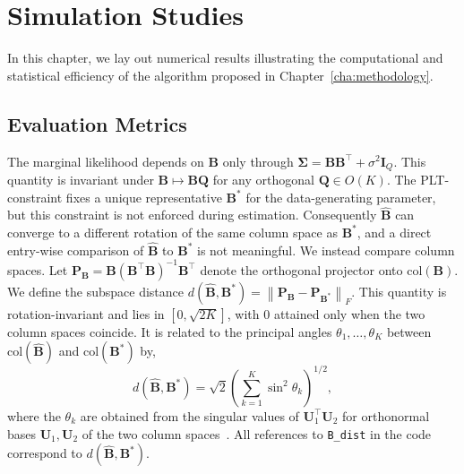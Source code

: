 \chapter{Simulation Studies}
\label{cha:simulation-result}

In this chapter, we lay out numerical results illustrating the computational and statistical efficiency of the algorithm proposed in Chapter~\ref{cha:methodology}. 

\section{Evaluation Metrics}
\label{sec:sim-metrics}
The marginal likelihood depends on $\mathbf{B}$ only through $\bm{\Sigma} = \mathbf{BB}^\top + \sigma^2 \mathbf{I}_Q$. This quantity is invariant under $\mathbf{B} \mapsto \mathbf{BQ}$ for any orthogonal $\mathbf{Q} \in O(K)$. The PLT-constraint fixes a unique representative $\mathbf{B}^{*}$ for the data-generating parameter, but this constraint is not enforced during estimation. Consequently $\hat{\mathbf{B}}$ can converge to a different rotation of the same column space as $\mathbf{B}^{*}$, and a direct entry-wise comparison of $\hat{\mathbf{B}}$ to $\mathbf{B}^{*}$ is not meaningful. We instead compare column spaces. Let $\mathbf{P}_{\mathbf{B}} = \mathbf{B}(\mathbf{B}^\top \mathbf{B})^{-1}\mathbf{B}^\top$ denote the orthogonal projector onto $\mathrm{col}(\mathbf{B})$. We define the subspace distance $d(\hat{\mathbf{B}}, \mathbf{B}^{*}) = \left\| \mathbf{P}_{\mathbf{B}} - \mathbf{P}_{\mathbf{B}^{*}}\right\|_F.$ This quantity is rotation-invariant and lies in $[0, \sqrt{2K}]$, with $0$ attained only when the two column spaces coincide. It is related to the principal angles $\theta_1,\dots,\theta_K$ between $\mathrm{col}(\hat{\mathbf{B}})$ and $\mathrm{col}(\mathbf{B}^{*})$ by,
\begin{equation}
    d(\hat{\mathbf{B}}, \mathbf{B}^{*}) = \sqrt{2}\left(\sum_{k=1}^K \sin^2\theta_k\right)^{1/2},
    \label{eq:b-dist-defi}
\end{equation}
where the $\theta_k$ are obtained from the singular values of $\mathbf{U}_1^\top \mathbf{U}_2$ for orthonormal bases $\mathbf{U}_1, \mathbf{U}_2$ of the two column spaces~\citep{Bjorck1973}. All references to \texttt{B\_dist} in the code correspond to $d(\hat{\mathbf{B}}, \mathbf{B}^{*})$.

